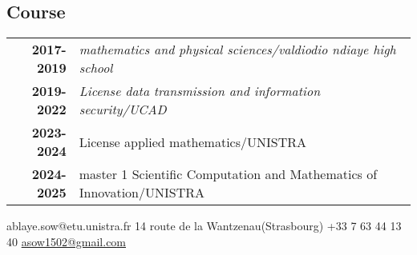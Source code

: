 \documentclass[lighthipster]{simplehipstercv}
\newlength{\rightcolwidth}
\begin{document}
\begin{paracol}{2}
\begin{minipage}[t]{0.3\textwidth}
\end{minipage}\hfill
\begin{minipage}[t]{0.3\textwidth}
\section*{Course}
\begin{tabular}{>{\footnotesize\bfseries}r >{\footnotesize}p{}}
    2017-2019 & \emph{mathematics and physical sciences/valdiodio ndiaye high school} \\
    2019-2022 & \emph{License data transmission and information security/UCAD} \\
    2023-2024 & License applied mathematics/UNISTRA\\
    2024-2025 & master 1 Scientific Computation and Mathematics of Innovation/UNISTRA
\end{tabular}
\bigskip

\end{minipage}






\vfill{} %

\setlength{\parindent}{0pt}
\begin{minipage}[t]{\rightcolwidth}
\begin{center}\fontfamily{\sfdefault}\selectfont \color{black!70}
{\small ablaye.sow@etu.unistra.fr  14 route de la Wantzenau(Strasbourg) \newline {} +33 7 63 44 13 40  \protect\url{asow1502@gmail.com}
}
\end{center}
\end{minipage}

\end{paracol}
\end{document}
